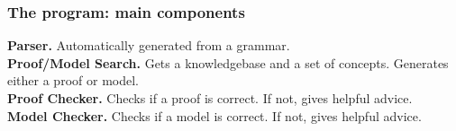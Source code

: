 \begin{frame}
  \frametitle{The program: main components}
\textbf{Parser.} Automatically generated from a grammar. \\
\pause
\textbf{Proof/Model Search.} Gets a knowledgebase and a set of concepts. Generates either
a proof or model. \\
\pause
\textbf{Proof Checker.} Checks if a proof is correct. If not, gives helpful advice. \\
\pause
\textbf{Model Checker.} Checks if a model is correct. If not, gives helpful advice. \\
\end{frame}